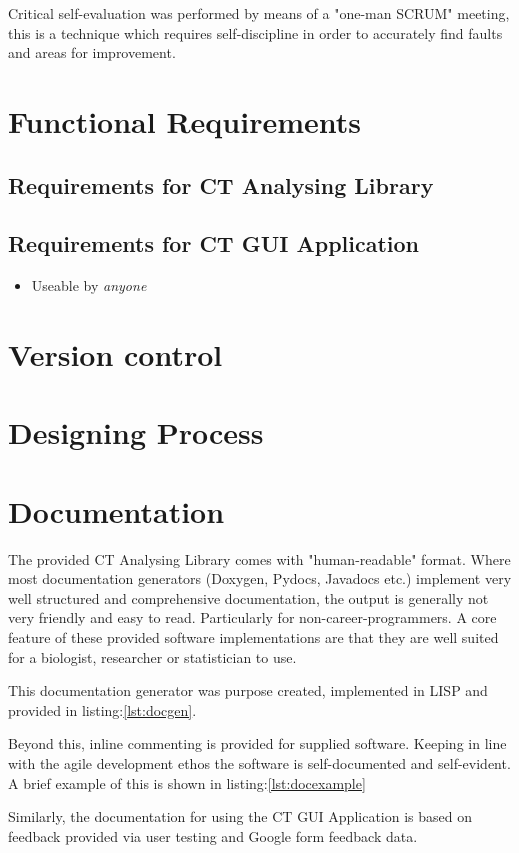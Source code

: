 \documentclass[11pt]{report}
\begin{document}
Critical self-evaluation was performed by means of a "one-man SCRUM" meeting, this is a technique which requires self-discipline in order to accurately find faults and areas for improvement.

\section{Functional Requirements}
\label{sec-2-2}
\subsection{Requirements for CT Analysing Library}
\label{sec-2-2-1}
\subsection{Requirements for CT GUI Application}
\label{sec-2-2-2}
\begin{itemize}
\item Useable by \emph{anyone}
\end{itemize}
\section{Version control}
\label{sec-2-3}
\section{Designing Process}
\label{sec-2-4}
\section{Documentation}
\label{sec-2-5}
The provided CT Analysing Library comes with "human-readable" format. Where most documentation generators (Doxygen, Pydocs, Javadocs etc.) implement very well structured and comprehensive documentation, the output is generally not very friendly and easy to read. Particularly for non-career-programmers. A core feature of these provided software implementations are that they are well suited for a biologist, researcher or statistician to use.

This documentation generator was purpose created, implemented in LISP and provided in listing:\ref{lst:docgen}.

Beyond this, inline commenting is provided for supplied software. Keeping in line with the agile development ethos the software is self-documented and self-evident. A brief example of this is shown in listing:\ref{lst:docexample}

Similarly, the documentation for using the CT GUI Application is based on feedback provided via user testing and Google form feedback data.
\end{document}
